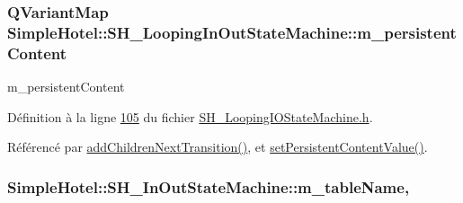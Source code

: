 \hypertarget{classSimpleHotel_1_1SH__LoopingInOutStateMachine_a6ed5f5c62373711ce123fb1a97fc3387}{
\subsubsection[{m\-\_\-persistent\-Content}]{\setlength{\rightskip}{0pt plus 5cm}Q\-Variant\-Map Simple\-Hotel\-::\-S\-H\-\_\-\-Looping\-In\-Out\-State\-Machine\-::m\-\_\-persistent\-Content\hspace{0.3cm}{\ttfamily [private]}}}\label{classSimpleHotel_1_1SH__LoopingInOutStateMachine_a6ed5f5c62373711ce123fb1a97fc3387}


m\-\_\-persistent\-Content 



Définition à la ligne \hyperlink{SH__LoopingIOStateMachine_8h_source_l00105}{105} du fichier \hyperlink{SH__LoopingIOStateMachine_8h_source}{S\-H\-\_\-\-Looping\-I\-O\-State\-Machine.\-h}.



Référencé par \hyperlink{classSimpleHotel_1_1SH__LoopingInOutStateMachine_a2ac2ff43d97fd1b12e1b30d6818f33e4}{add\-Children\-Next\-Transition()}, et \hyperlink{classSimpleHotel_1_1SH__LoopingInOutStateMachine_a688f77a7c6dbbf102cf75234a58b4f97}{set\-Persistent\-Content\-Value()}.

\hypertarget{classSimpleHotel_1_1SH__InOutStateMachine_a15c063debdaa4c87bd4925867a13ce9e}{
\subsubsection[{m\-\_\-table\-Name}]{\setlength{\rightskip}{0pt plus 5cm}Simple\-Hotel\-::\-S\-H\-\_\-\-In\-Out\-State\-Machine\-::m\-\_\-table\-Name\hspace{0.3cm}{\ttfamily [protected]}, {\ttfamily [inherited]}}}\label{classSimpleHotel_1_1SH__InOutStateMachine_a15c063debdaa4c87bd4925867a13ce9e}



